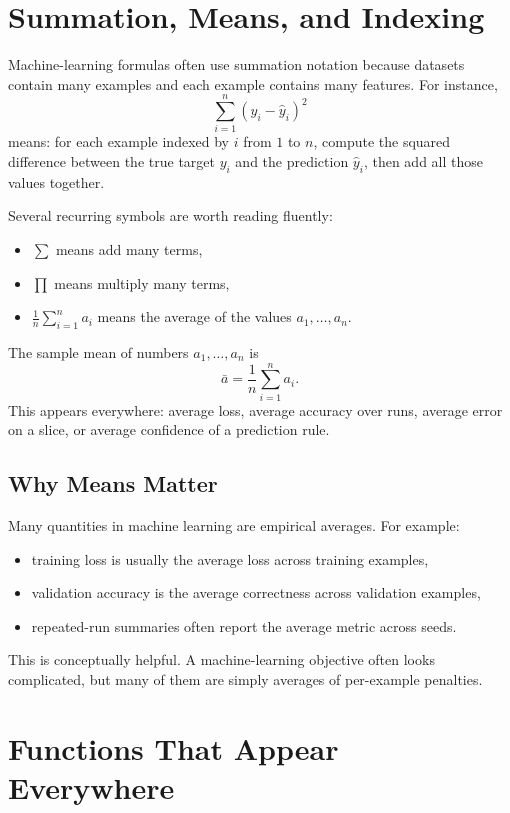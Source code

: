 \section{Summation, Means, and Indexing}

Machine-learning formulas often use summation notation because datasets contain many examples and each example contains many features. For instance,
\[
\sum_{i=1}^{n} (y_i - \hat{y}_i)^2
\]
means: for each example indexed by $i$ from $1$ to $n$, compute the squared difference between the true target $y_i$ and the prediction $\hat{y}_i$, then add all those values together.

Several recurring symbols are worth reading fluently:
\begin{itemize}[leftmargin=*]
\item $\sum$ means add many terms,
\item $\prod$ means multiply many terms,
\item $\frac{1}{n}\sum_{i=1}^{n} a_i$ means the average of the values $a_1,\ldots,a_n$.
\end{itemize}

The sample mean of numbers $a_1,\ldots,a_n$ is
\[
\bar{a} = \frac{1}{n}\sum_{i=1}^{n} a_i.
\]
This appears everywhere: average loss, average accuracy over runs, average error on a slice, or average confidence of a prediction rule.

\subsection{Why Means Matter}

Many quantities in machine learning are empirical averages. For example:
\begin{itemize}[leftmargin=*]
\item training loss is usually the average loss across training examples,
\item validation accuracy is the average correctness across validation examples,
\item repeated-run summaries often report the average metric across seeds.
\end{itemize}

This is conceptually helpful. A machine-learning objective often looks complicated, but many of them are simply averages of per-example penalties.

\section{Functions That Appear Everywhere}

